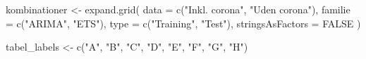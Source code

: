 \documentclass[
  danish,
]{article}
\newenvironment{Shaded}{\begin{snugshade}}{\end{snugshade}}
\newcommand{\AttributeTok}[1]{\textcolor[rgb]{0.40,0.45,0.13}{#1}}
\newcommand{\ConstantTok}[1]{\textcolor[rgb]{0.56,0.35,0.01}{#1}}
\newcommand{\FunctionTok}[1]{\textcolor[rgb]{0.28,0.35,0.67}{#1}}
\newcommand{\NormalTok}[1]{\textcolor[rgb]{0.00,0.23,0.31}{#1}}
\newcommand{\OtherTok}[1]{\textcolor[rgb]{0.00,0.23,0.31}{#1}}
\newcommand{\StringTok}[1]{\textcolor[rgb]{0.13,0.47,0.30}{#1}}
\begin{document}
\begin{Shaded}
\begin{Highlighting}[]
\NormalTok{kombinationer }\OtherTok{\textless{}{-}} \FunctionTok{expand.grid}\NormalTok{(}
  \AttributeTok{data    =} \FunctionTok{c}\NormalTok{(}\StringTok{"Inkl. corona"}\NormalTok{, }\StringTok{"Uden corona"}\NormalTok{),}
  \AttributeTok{familie =} \FunctionTok{c}\NormalTok{(}\StringTok{"ARIMA"}\NormalTok{, }\StringTok{"ETS"}\NormalTok{),}
  \AttributeTok{type    =} \FunctionTok{c}\NormalTok{(}\StringTok{"Training"}\NormalTok{, }\StringTok{"Test"}\NormalTok{),}
  \AttributeTok{stringsAsFactors =} \ConstantTok{FALSE}
\NormalTok{)}

\NormalTok{tabel\_labels }\OtherTok{\textless{}{-}} \FunctionTok{c}\NormalTok{(}\StringTok{"A"}\NormalTok{, }\StringTok{"B"}\NormalTok{, }\StringTok{"C"}\NormalTok{, }\StringTok{"D"}\NormalTok{, }\StringTok{"E"}\NormalTok{, }\StringTok{"F"}\NormalTok{, }\StringTok{"G"}\NormalTok{, }\StringTok{"H"}\NormalTok{)}
\end{Highlighting}
\end{Shaded}
\end{document}
